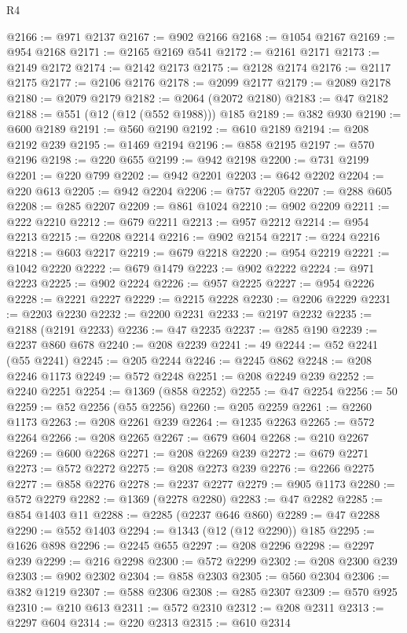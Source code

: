 \begin{lexlean}{R4}
\begin{coremodule}
@2166 := @971 @2137
@2167 := @902 @2166
@2168 := @1054 @2167
@2169 := @954 @2168
@2171 := @2165 @2169 @541
@2172 := @2161 @2171
@2173 := @2149 @2172
@2174 := @2142 @2173
@2175 := @2128 @2174
@2176 := @2117 @2175
@2177 := @2106 @2176
@2178 := @2099 @2177
@2179 := @2089 @2178
@2180 := @2079 @2179
@2182 := @2064 (@2072 @2180)
@2183 := @47 @2182
@2188 := @551 (@12 (@12 (@552 @1988))) @185
@2189 := @382 @930
@2190 := @600 @2189
@2191 := @560 @2190
@2192 := @610 @2189
@2194 := @208 @2192 @239
@2195 := @1469 @2194
@2196 := @858 @2195
@2197 := @570 @2196
@2198 := @220 @655
@2199 := @942 @2198
@2200 := @731 @2199
@2201 := @220 @799
@2202 := @942 @2201
@2203 := @642 @2202
@2204 := @220 @613
@2205 := @942 @2204
@2206 := @757 @2205
@2207 := @288 @605
@2208 := @285 @2207
@2209 := @861 @1024
@2210 := @902 @2209
@2211 := @222 @2210
@2212 := @679 @2211
@2213 := @957 @2212
@2214 := @954 @2213
@2215 := @2208 @2214
@2216 := @902 @2154
@2217 := @224 @2216
@2218 := @603 @2217
@2219 := @679 @2218
@2220 := @954 @2219
@2221 := @1042 @2220
@2222 := @679 @1479
@2223 := @902 @2222
@2224 := @971 @2223
@2225 := @902 @2224
@2226 := @957 @2225
@2227 := @954 @2226
@2228 := @2221 @2227
@2229 := @2215 @2228
@2230 := @2206 @2229
@2231 := @2203 @2230
@2232 := @2200 @2231
@2233 := @2197 @2232
@2235 := @2188 (@2191 @2233)
@2236 := @47 @2235
@2237 := @285 @190
@2239 := @2237 @860 @678
@2240 := @208 @2239
@2241 := 49
@2244 := @52 @2241 (@55 @2241)
@2245 := @205 @2244
@2246 := @2245 @862
@2248 := @208 @2246 @1173
@2249 := @572 @2248
@2251 := @208 @2249 @239
@2252 := @2240 @2251
@2254 := @1369 (@858 @2252)
@2255 := @47 @2254
@2256 := 50
@2259 := @52 @2256 (@55 @2256)
@2260 := @205 @2259
@2261 := @2260 @1173
@2263 := @208 @2261 @239
@2264 := @1235 @2263
@2265 := @572 @2264
@2266 := @208 @2265
@2267 := @679 @604
@2268 := @210 @2267
@2269 := @600 @2268
@2271 := @208 @2269 @239
@2272 := @679 @2271
@2273 := @572 @2272
@2275 := @208 @2273 @239
@2276 := @2266 @2275
@2277 := @858 @2276
@2278 := @2237 @2277
@2279 := @905 @1173
@2280 := @572 @2279
@2282 := @1369 (@2278 @2280)
@2283 := @47 @2282
@2285 := @854 @1403 @11
@2288 := @2285 (@2237 @646 @860)
@2289 := @47 @2288
@2290 := @552 @1403
@2294 := @1343 (@12 (@12 @2290)) @185
@2295 := @1626 @898
@2296 := @2245 @655
@2297 := @208 @2296
@2298 := @2297 @239
@2299 := @216 @2298
@2300 := @572 @2299
@2302 := @208 @2300 @239
@2303 := @902 @2302
@2304 := @858 @2303
@2305 := @560 @2304
@2306 := @382 @1219
@2307 := @588 @2306
@2308 := @285 @2307
@2309 := @570 @925
@2310 := @210 @613
@2311 := @572 @2310
@2312 := @208 @2311
@2313 := @2297 @604
@2314 := @220 @2313
@2315 := @610 @2314

\end{coremodule}
\end{lexlean}
